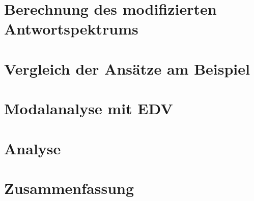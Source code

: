 \documentclass[12pt, oneside]{report}
\begin{document}
\chapter{Berechnung des modifizierten Antwortspektrums}


\chapter{Vergleich der Ansätze am Beispiel}


\chapter{Modalanalyse mit EDV}


\chapter{Analyse}\label{cap:analyse}


\chapter{Zusammenfassung}


\appendix

\end{document}
